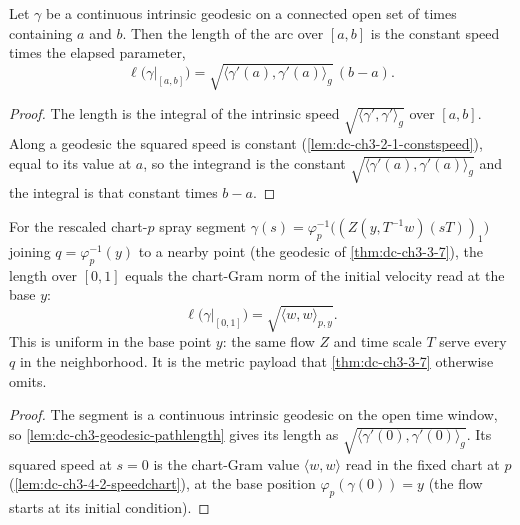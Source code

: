\begin{lemma}
  \label{lem:dc-ch3-geodesic-pathlength}


  Let $\gamma$ be a continuous intrinsic geodesic on a connected open set of times containing
  $a$ and $b$. Then the length of the arc over $[a,b]$ is the constant speed times the elapsed
  parameter,
  \[
    \ell\big(\gamma|_{[a,b]}\big)=\sqrt{\langle\gamma'(a),\gamma'(a)\rangle_g}\,(b-a).
  \]
\end{lemma}
\begin{proof}
  \sketch

  The length is the integral of the intrinsic speed $\sqrt{\langle\gamma',\gamma'\rangle_g}$ over
  $[a,b]$. Along a geodesic the squared speed is constant (\cref{lem:dc-ch3-2-1-constspeed}), equal
  to its value at $a$, so the integrand is the constant $\sqrt{\langle\gamma'(a),\gamma'(a)\rangle_g}$
  and the integral is that constant times $b-a$.
\end{proof}

\begin{lemma}
  \label{lem:dc-ch3-4-2-segment-length}


  For the rescaled chart-$p$ spray segment $\gamma(s)=\varphi_p^{-1}\big((Z(y,T^{-1}w)(sT))_1\big)$
  joining $q=\varphi_p^{-1}(y)$ to a nearby point (the geodesic of \cref{thm:dc-ch3-3-7}), the length
  over $[0,1]$ equals the chart-Gram norm of the initial velocity read at the base $y$:
  \[
    \ell\big(\gamma|_{[0,1]}\big)=\sqrt{\langle w,w\rangle_{p,y}}.
  \]
  This is uniform in the base point $y$: the same flow $Z$ and time scale $T$ serve every $q$ in the
  neighborhood. It is the metric payload that \cref{thm:dc-ch3-3-7} otherwise omits.
\end{lemma}
\begin{proof}
  \sketch

  The segment is a continuous intrinsic geodesic on the open time window, so
  \cref{lem:dc-ch3-geodesic-pathlength} gives its length as
  $\sqrt{\langle\gamma'(0),\gamma'(0)\rangle_g}$. Its squared speed at $s=0$ is the chart-Gram value
  $\langle w,w\rangle$ read in the fixed chart at $p$ (\cref{lem:dc-ch3-4-2-speedchart}), at the base
  position $\varphi_p(\gamma(0))=y$ (the flow starts at its initial condition).
\end{proof}

